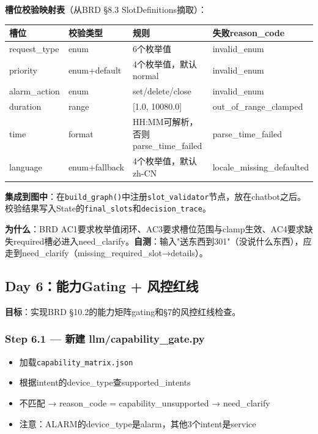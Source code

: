 \documentclass[12pt,a4paper]{ctexart}
\begin{document}
\textbf{槽位校验映射表}（从BRD §8.3 SlotDefinitions摘取）：

\begin{table}[h]
\centering
\begin{tabular}{@{}llll@{}}
\toprule
\textbf{槽位} & \textbf{校验类型} & \textbf{规则} & \textbf{失败reason\_code} \\
\midrule
request\_type & enum & 6个枚举值 & invalid\_enum \\
priority & enum+default & 4个枚举值，默认normal & invalid\_enum \\
alarm\_action & enum & set/delete/close & invalid\_enum \\
duration & range & [1.0, 10080.0] & out\_of\_range\_clamped \\
time & format & HH:MM可解析，否则 parse\_time\_failed & parse\_time\_failed \\
language & enum+fallback & 4个枚举值，默认zh-CN & locale\_missing\_defaulted \\
\bottomrule
\end{tabular}
\end{table}

\textbf{集成到图中}：在\texttt{build\_graph()}中注册\texttt{slot\_validator}节点，放在chatbot之后。校验结果写入State的\texttt{final\_slots}和\texttt{decision\_trace}。

\textbf{为什么}：BRD AC1要求枚举值闭环、AC3要求槽位范围与clamp生效、AC4要求缺失required槽必进入need\_clarify。\textbf{自测}：输入"送东西到301"（没说什么东西），应走到need\_clarify（missing\_required\_slot→details）。

\subsection{Day 6：能力Gating + 风控红线}

\textbf{目标}：实现BRD §10.2的能力矩阵gating和§7的风控红线检查。

\subsubsection*{Step 6.1 — 新建 llm/capability\_gate.py}

\begin{itemize}
    \item 加载\texttt{capability\_matrix.json}
    \item 根据intent的device\_type查supported\_intents
    \item 不匹配 → reason\_code = capability\_unsupported → need\_clarify
    \item 注意：ALARM的device\_type是alarm，其他3个intent是service
\end{itemize}
\end{document}
